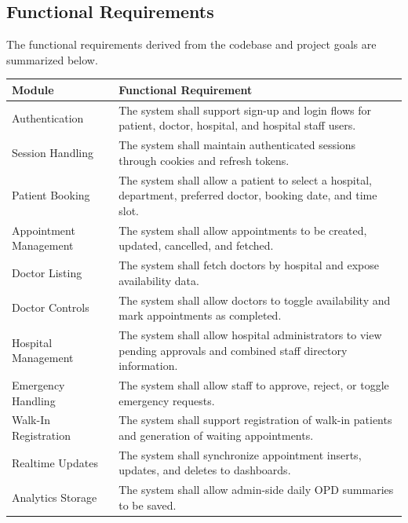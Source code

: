 \documentclass[12pt,onecolumn]{IEEEtran}
\begin{document}
\subsection{Functional Requirements}
The functional requirements derived from the codebase and project goals are summarized below.

\begin{longtable}{p{}p{}}
\toprule
\textbf{Module} & \textbf{Functional Requirement} \\
\midrule
Authentication & The system shall support sign-up and login flows for patient, doctor, hospital, and hospital staff users. \\
Session Handling & The system shall maintain authenticated sessions through cookies and refresh tokens. \\
Patient Booking & The system shall allow a patient to select a hospital, department, preferred doctor, booking date, and time slot. \\
Appointment Management & The system shall allow appointments to be created, updated, cancelled, and fetched. \\
Doctor Listing & The system shall fetch doctors by hospital and expose availability data. \\
Doctor Controls & The system shall allow doctors to toggle availability and mark appointments as completed. \\
Hospital Management & The system shall allow hospital administrators to view pending approvals and combined staff directory information. \\
Emergency Handling & The system shall allow staff to approve, reject, or toggle emergency requests. \\
Walk-In Registration & The system shall support registration of walk-in patients and generation of waiting appointments. \\
Realtime Updates & The system shall synchronize appointment inserts, updates, and deletes to dashboards. \\
Analytics Storage & The system shall allow admin-side daily OPD summaries to be saved. \\
\bottomrule
\end{longtable}
\end{document}
